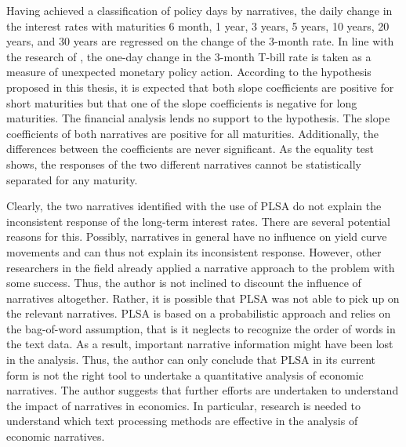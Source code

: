 \documentclass[11pt,a4paper,english,oneside]{book}
\numberwithin{equation}{chapter}
\begin{document}
Having achieved a classification of policy days by narratives, the daily change in the interest rates with maturities 6 month, 1 year, 3 years, 5 years, 10 years, 20 years, and 30 years are regressed on the change of the 3-month rate. In line with the research of \citet{Ellingsen.2003}, the one-day change in the 3-month T-bill rate is taken as a measure of unexpected monetary policy action. According to the hypothesis proposed in this thesis, it is expected that both slope coefficients are positive for short maturities but that one of the slope coefficients is negative for long maturities. The financial analysis lends no support to the hypothesis. The slope coefficients of both narratives are positive for all maturities. Additionally, the differences between the coefficients are never significant. As the equality test shows, the responses of the two different narratives cannot be statistically separated for any maturity.

Clearly, the two narratives identified with the use of PLSA do not explain the inconsistent response of the long-term interest rates. There are several potential reasons for this. Possibly, narratives in general have no influence on yield curve movements and can thus not explain its inconsistent response. However, other researchers in the field already applied a narrative approach to the problem with some success. Thus, the author is not inclined to discount the influence of narratives altogether. Rather, it is possible that PLSA was not able to pick up on the relevant narratives. PLSA is based on a probabilistic approach and relies on the bag-of-word assumption, that is it neglects to recognize the order of words in the text data. As a result, important narrative information might have been lost in the analysis. Thus, the author can only conclude that PLSA in its current form is not the right tool to undertake a quantitative analysis of economic narratives. The author suggests that further efforts are undertaken to understand the impact of narratives in economics. In particular, research is needed to understand which text processing methods are effective in the analysis of economic narratives.  


\newpage

{} 





\newpage

\appendix
\noappendicestocpagenum
\addappheadtotoc
\end{document}
